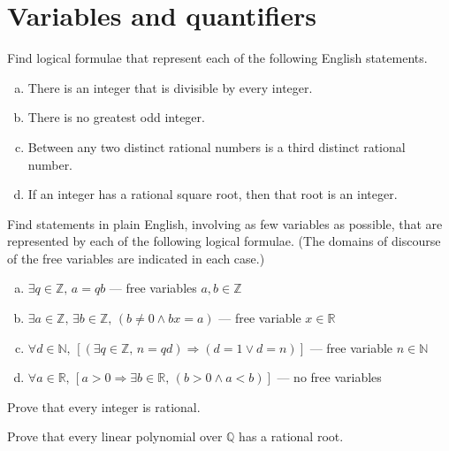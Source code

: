 \section{Variables and quantifiers}


\begin{exercise}
\label{exEnglishToLogicalFormulae}
Find logical formulae that represent each of the following English statements.
\begin{enumerate}[(a)]
\item There is an integer that is divisible by every integer.
\item There is no greatest odd integer.
\item Between any two distinct rational numbers is a third distinct rational number.
\item If an integer has a rational square root, then that root is an integer.
\end{enumerate}
\end{exercise}

\begin{exercise}
\label{exLogicalFormulaeToEnglish}
Find statements in plain English, involving as few variables as possible, that are represented by each of the following logical formulae. (The domains of discourse of the free variables are indicated in each case.)
\begin{enumerate}[(a)]
\item $\exists q \in \mathbb{Z},\, a = qb$ --- free variables $a, b \in \mathbb{Z}$
\item $\exists a \in \mathbb{Z},\, \exists b \in \mathbb{Z},\, (b \ne 0 \wedge bx = a)$ --- free variable $x \in \mathbb{R}$
\item $\forall d \in \mathbb{N},\, [(\exists q \in \mathbb{Z},\, n=qd) \Rightarrow (d = 1 \vee d = n)]$ --- free variable $n \in \mathbb{N}$
\item $\forall a \in \mathbb{R},\, [a > 0 \Rightarrow \exists b \in \mathbb{R},\, (b > 0 \wedge a < b)]$ --- no free variables
\end{enumerate}
\end{exercise}


\begin{exercise}
\label{exEveryIntegerIsRational}
Prove that every integer is rational.
\end{exercise}

\begin{exercise}
Prove that every linear polynomial over $\mathbb{Q}$ has a rational root.
\end{exercise}

